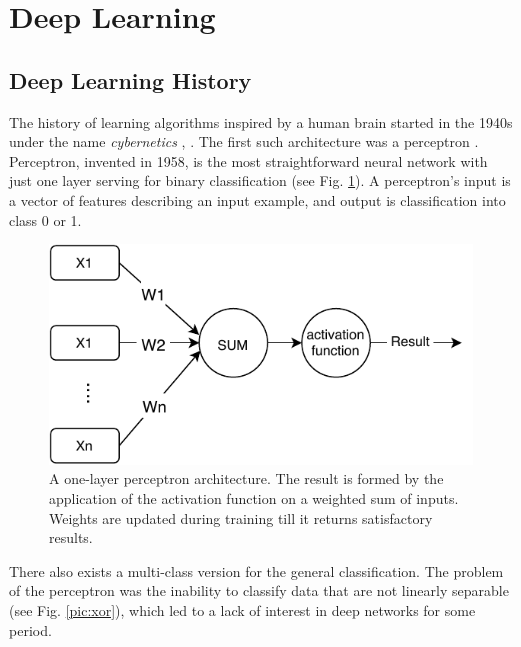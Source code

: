 \section{Deep Learning}

\subsection{Deep Learning History}
The history of learning algorithms inspired by a human brain started in the 1940s under the name \textit{cybernetics} \citep{Goodfellow-et-al-2016}, \citep{McCulloch}. The first such architecture was a perceptron \citep{Rosenblatt1958}.
Perceptron, invented in 1958, is the most straightforward neural network with just one layer serving for binary classification (see Fig. \ref{pic:perceptron}). A perceptron's input is a vector of features describing an input example, and output is classification into class 0 or 1.

\begin{figure}[ht]
\centering
\includegraphics[width=0.8\columnwidth]{../img/perceptron}
\caption{A one-layer perceptron architecture. The result is formed by the application of the activation function on a weighted sum of inputs. Weights are updated during training till it returns satisfactory results. }
\label{pic:perceptron}
\end{figure}

There also exists a multi-class version for the general classification. The problem of the perceptron was the inability to classify data that are not linearly separable \citep{Minsky2017} (see Fig. \ref{pic:xor}), which led to a lack of interest in deep networks for some period.

